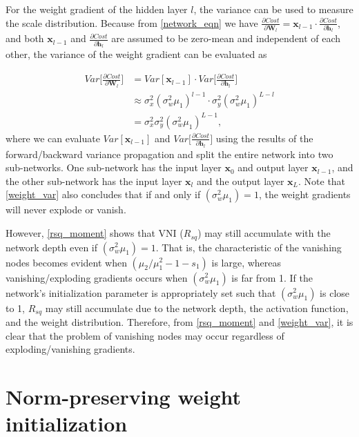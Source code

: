 For the weight gradient of the hidden layer $l$, the variance can be used to measure the scale distribution.
Because from \eqref{network_eqn} we have $\frac{\partial Cost}{\partial \mathbf{W}_l}
=\mathbf{x}_{l-1}\cdot\frac{\partial Cost}{\partial \mathbf{h}_l}$, and both $\mathbf{x}_{l-1}$ and $\frac{\partial Cost}{\partial \mathbf{h}_l}$ are assumed to be zero-mean and independent of each other, the variance of the weight gradient can be evaluated as

\begin{equation}
    \begin{aligned}
    Var\Big[\frac{\partial Cost}{\partial \mathbf{W}_l}\Big]
    &=
    Var[\mathbf{x}_{l-1}]\cdot
    Var\Big[\frac{\partial Cost}{\partial \mathbf{h}_l}\Big]\\
    &
    \approx
    \sigma_x^2(\sigma_w^2\mu_1)^{l-1}\cdot
    \sigma_y^2(\sigma_w^2\mu_1)^{L-l}\\
    &=
    \sigma_x^2\sigma_y^2(\sigma_w^2\mu_1)^{L-1},
    \end{aligned}
    \label{weight_var}
\end{equation}
where we can evaluate $Var[\mathbf{x}_{l-1}]$ and $Var\Big[\frac{\partial Cost}{\partial \mathbf{h}_l}\Big]$ using the results of the forward/backward variance propagation and split the entire network into two sub-networks. One sub-network has the input layer $\mathbf{x}_{0}$ and output layer $\mathbf{x}_{l-1}$, and the other sub-network has the input layer $\mathbf{x}_{l}$ and the output layer $\mathbf{x}_{L}$. Note that \eqref{weight_var} also concludes that if and only if $(\sigma_w^2\mu_1)=1$, the weight gradients will never explode or vanish.

However, \eqref{rsq_moment} shows that VNI ($R_{sq}$) may still accumulate with the network depth even
if $(\sigma_w^2\mu_1)=1$. That is, the characteristic of the vanishing nodes becomes evident 
when $(\mu_2/\mu_1^2-1-s_1)$ is large, whereas vanishing/exploding gradients occurs when
$(\sigma_w^2\mu_1)$ is far from 1. If the network's initialization parameter is appropriately set such
that $(\sigma_w^2\mu_1)$ is close to 1, $R_{sq}$ may still accumulate due to the network depth, the
activation function, and the weight distribution. Therefore, from \eqref{rsq_moment} and
\eqref{weight_var}, it is clear that the problem of vanishing nodes  may occur regardless of 
exploding/vanishing gradients.

\section{Norm-preserving weight initialization} \label{comp:init}




